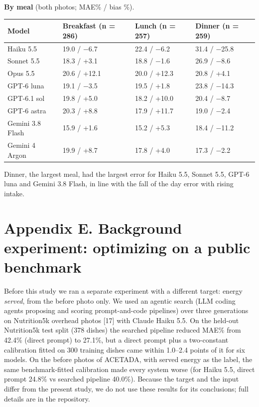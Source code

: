 \documentclass[
  11pt,
  letterpaper]{article}
\newcounter{none} %
\begin{document}
\textbf{By meal} (both photos; MAE\% / bias \%).

{\def\LTcaptype{none} %
\begin{longtable}[]{@{}llll@{}}
\toprule\noalign{}
Model & Breakfast (n = 286) & Lunch (n = 257) & Dinner (n = 259) \\
\midrule\noalign{}
\endhead
\bottomrule\noalign{}
\endlastfoot
Haiku 5.5 & 19.0 / −6.7 & 22.4 / −6.2 & 31.4 / −25.8 \\
Sonnet 5.5 & 18.3 / +3.1 & 18.8 / −1.6 & 26.9 / −8.6 \\
Opus 5.5 & 20.6 / +12.1 & 20.0 / +12.3 & 20.8 / +4.1 \\
GPT-6 luna & 19.1 / −3.5 & 19.5 / +1.8 & 23.8 / −14.3 \\
GPT-6.1 sol & 19.8 / +5.0 & 18.2 / +10.0 & 20.4 / −8.7 \\
GPT-6 astra & 20.3 / +8.8 & 17.9 / +11.7 & 19.0 / −2.4 \\
Gemini 3.8 Flash & 15.9 / +1.6 & 15.2 / +5.3 & 18.4 / −11.2 \\
Gemini 4 Argon & 19.9 / +8.7 & 17.8 / +4.0 & 17.3 / −2.2 \\
\end{longtable}
}

Dinner, the largest meal, had the largest error for Haiku 5.5, Sonnet 5.5, GPT-6 luna and Gemini 3.8 Flash, in
line with the fall of the day error with rising intake.

\section*{Appendix E. Background experiment: optimizing on a public
benchmark}\label{appendix-e.-background-experiment-optimizing-on-a-public-benchmark}

Before this study we ran a separate experiment with a different target: energy \emph{served}, from the before
photo only. We used an agentic search (LLM coding agents proposing and scoring prompt-and-code pipelines) over
three generations on Nutrition5k overhead photos {[}17{]} with Claude Haiku 5.5. On the held-out Nutrition5k
test split (378 dishes) the searched pipeline reduced MAE\% from 42.4\% (direct prompt) to 27.1\%, but a
direct prompt plus a two-constant calibration fitted on 300 training dishes came within 1.0--2.4 points of it
for six models. On the before photos of ACETADA, with served energy as the label, the same benchmark-fitted
calibration made every system worse (for Haiku 5.5, direct prompt 24.8\% vs searched pipeline 40.0\%). Because
the target and the input differ from the present study, we do not use these results for its conclusions; full
details are in the repository.
\end{document}
